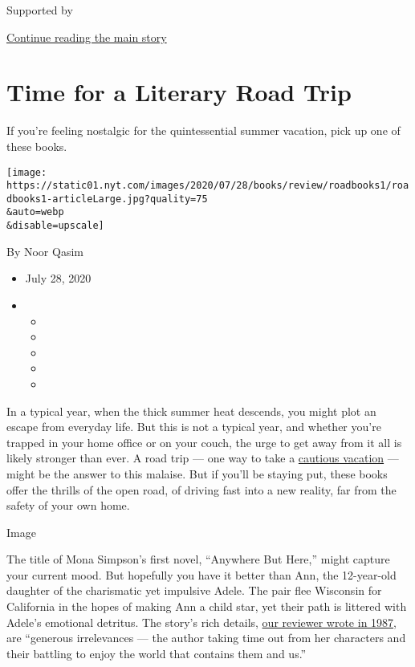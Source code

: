 Supported by

\protect\hyperlink{after-sponsor}{Continue reading the main story}

\hypertarget{time-for-a-literary-road-trip}{%
\section{Time for a Literary Road
Trip}\label{time-for-a-literary-road-trip}}

If you're feeling nostalgic for the quintessential summer vacation, pick
up one of these books.

\texttt{[image: https://static01.nyt.com/images/2020/07/28/books/review/roadbooks1/roadbooks1-articleLarge.jpg?quality=75\\\&auto=webp\\\&disable=upscale]}

By Noor Qasim

\begin{itemize}
\item
  July 28, 2020
\item
  \begin{itemize}
  \item
  \item
  \item
  \item
  \item
  \end{itemize}
\end{itemize}

In a typical year, when the thick summer heat descends, you might plot
an escape from everyday life. But this is not a typical year, and
whether you're trapped in your home office or on your couch, the urge to
get away from it all is likely stronger than ever. A road trip --- one
way to take a
\href{https://www.nytimes.com/2020/07/16/travel/virus-vacation.html?searchResultPosition=4}{cautious
vacation} --- might be the answer to this malaise. But if you'll be
staying put, these books offer the thrills of the open road, of driving
fast into a new reality, far from the safety of your own home.

Image

The title of Mona Simpson's first novel, ``Anywhere But Here,'' might
capture your current mood. But hopefully you have it better than Ann,
the 12-year-old daughter of the charismatic yet impulsive Adele. The
pair flee Wisconsin for California in the hopes of making Ann a child
star, yet their path is littered with Adele's emotional detritus. The
story's rich details,
\href{https://www.nytimes.com/1987/01/11/books/in-thrall-to-a-lethal-mother.html}{our
reviewer wrote in 1987}, are ``generous irrelevances --- the author
taking time out from her characters and their battling to enjoy the
world that contains them and us.''

